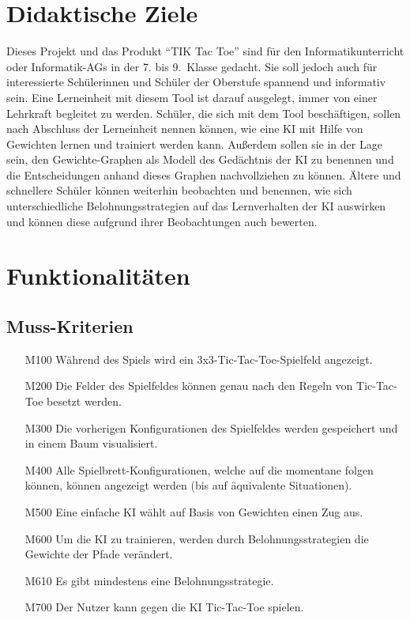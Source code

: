 \documentclass[titlepage]{scrartcl}
\newcommand{\TicTacToe}{TI\reflectbox K Tac Toe}
\begin{document}
\section{Didaktische Ziele}
Dieses Projekt und das Produkt "`\TicTacToe"' sind für den Informatikunterricht oder Informatik-AGs in der 7. bis 9.\ Klasse gedacht.
Sie soll jedoch auch für interessierte Schülerinnen und Schüler der Oberstufe spannend und informativ sein.
Eine Lerneinheit mit diesem Tool ist darauf ausgelegt, immer von einer Lehrkraft begleitet zu werden.
Schüler, die sich mit dem Tool beschäftigen, sollen nach Abschluss der Lerneinheit nennen können, wie eine KI mit Hilfe von Gewichten lernen und trainiert werden kann.
Außerdem sollen sie in der Lage sein, den Gewichte-Graphen als Modell des Gedächtnis der KI zu benennen und die Entscheidungen anhand dieses Graphen nachvollziehen zu können.
Ältere und schnellere Schüler können weiterhin beobachten und benennen,
wie sich unterschiedliche Belohnungsstrategien auf das Lernverhalten der KI auswirken und können diese aufgrund ihrer Beobachtungen auch bewerten.

\section{Funktionalitäten}%
\subsection{Muss-Kriterien}
	\begin{itemize}
		\item[M100] Während des Spiels wird ein 3x3-Tic-Tac-Toe-Spielfeld angezeigt.
		\item[M200] Die Felder des Spielfeldes können genau nach den Regeln von Tic-Tac-Toe besetzt werden.
		\item[M300] Die vorherigen Konfigurationen des Spielfeldes werden gespeichert und in einem Baum visualisiert.
		\item[M400] Alle Spielbrett-Konfigurationen, welche auf die momentane folgen können, können angezeigt werden (bis auf äquivalente Situationen).
		\item[M500] Eine einfache KI wählt auf Basis von Gewichten einen Zug aus.
		\item[M600] Um die KI zu trainieren, werden durch Belohnungsstrategien die Gewichte der Pfade verändert.
		\item[M610] Es gibt mindestens eine Belohnungsstrategie.
		\item[M700] Der Nutzer kann gegen die KI Tic-Tac-Toe spielen.
	\end{itemize}
\end{document}
